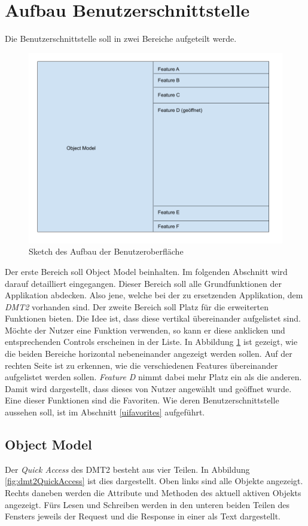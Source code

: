 \section{Aufbau Benutzerschnittstelle}\label{aufbauUI}
Die Benutzerschnittstelle soll in zwei Bereiche aufgeteilt werde.
\begin{figure}[H]
   \centering
   \includegraphics[width=1.0\textwidth]{gfx/App strucutre sketch.png}
   \caption{
      Sketch des Aufbau der Benutzeroberfläche
      }
      \label{fig:uisketch}
   \end{figure}
Der erste Bereich soll Object Model beinhalten.
Im folgenden Abschnitt wird darauf detailliert eingegangen.
Dieser Bereich soll alle Grundfunktionen der Applikation abdecken.
Also jene, welche bei der zu ersetzenden Applikation, dem \textit{DMT2} vorhanden sind.
Der zweite Bereich soll Platz für die erweiterten Funktionen bieten.
Die Idee ist, dass diese vertikal übereinander aufgelistet sind.
Möchte der Nutzer eine Funktion verwenden, so kann er diese anklicken und entsprechenden Controls erscheinen in der Liste.
In Abbildung \ref{fig:uisketch} ist gezeigt, wie die beiden Bereiche horizontal nebeneinander angezeigt werden sollen.
Auf der rechten Seite ist zu erkennen, wie die verschiedenen Features übereinander aufgelistet werden sollen.
\textit{Feature D} nimmt dabei mehr Platz ein als die anderen.
Damit wird dargestellt, dass dieses von Nutzer angewählt und geöffnet wurde.
Eine dieser Funktionen sind die Favoriten.
Wie deren Benutzerschnittstelle aussehen soll, ist im Abschnitt \ref{uifavorites} aufgeführt.

\subsection{Object Model}
Der \textit{Quick Access} des \ac{DMT2} besteht aus vier Teilen.
In Abbildung \ref{fig:dmt2QuickAccess} ist dies dargestellt.
Oben links sind alle Objekte angezeigt.
Rechts daneben werden die Attribute und Methoden des aktuell aktiven Objekts angezeigt.
Fürs Lesen und Schreiben werden in den unteren beiden Teilen des Fensters jeweils der Request und die Response in einer als  Text dargestellt.


